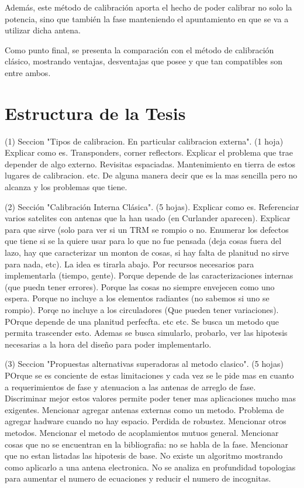 Además, este método de calibración aporta el hecho de poder calibrar no solo la potencia, sino que también la fase 
manteniendo el apuntamiento en que se va a utilizar dicha antena.

Como punto final, se presenta la comparación con el método de calibración clásico, mostrando ventajas, desventajas 
que posee y que tan compatibles son entre ambos.


\section{Estructura de la Tesis}

 (1) Seccion "Tipos de calibracion. En particular calibracion externa". (1 hoja)
 Explicar como es. Transponders, corner reflectors. Explicar el problema que trae depender de algo externo. Revisitas espaciadas. Mantenimiento en tierra de estos lugares de calibracion. etc.
 De alguna manera decir que es la mas sencilla pero no alcanza y los problemas que tiene.

 (2) Sección "Calibración Interna Clásica". (5 hojas).
 Explicar como es. Referenciar varios satelites con antenas que la han usado (en Curlander aparecen).
 Explicar para que sirve (solo para ver si un TRM se rompio o no. Enumerar los defectos que tiene si se la quiere usar para lo que no fue pensada (deja cosas fuera del lazo, hay que caracterizar un monton de cosas, si hay falta de planitud no sirve para nada, etc).
 La idea es tirarla abajo. Por recursos necesarios para implementarla (tiempo, gente). Porque depende de las caracterizaciones internas (que puedn tener errores). Porque las cosas no siempre envejecen como uno espera. Porque no incluye a los elementos radiantes (no sabemos si uno se rompio). Porqe no incluye a los circuladores (Que pueden tener variaciones). POrque depende de una planitud perfecfta. etc etc. Se busca un metodo que permita trascender esto. Ademas se busca simularlo, probarlo, ver las hipotesis necesarias a la hora del diseño para poder implementarlo.
 
 (3) Seccion "Propuestas alternativas superadoras al metodo clasico". (5 hojas)
 POrque se es conciente de estas limitaciones y cada vez se le pide mas en cuanto a requerimientos de fase y atenuacion a las antenas de arreglo de fase. Discriminar mejor estos valores permite poder tener mas aplicaciones mucho mas exigentes.
 Mencionar agregar antenas externas como un metodo. Problema de agregar hadware cuando no hay espacio. Perdida de robustez.
 Mencionar otros metodos. Mencionar el metodo de acoplamientos mutuos general.
 Mencionar cosas que no se encuentran en la bibliografia: no se habla de la fase.
 Mencionar que no estan listadas las hipotesis de base. No existe un algoritmo mostrando como aplicarlo a una antena electronica.  No se analiza en profundidad topologias para aumentar el numero de ecuaciones y reducir el numero de incognitas.
 
